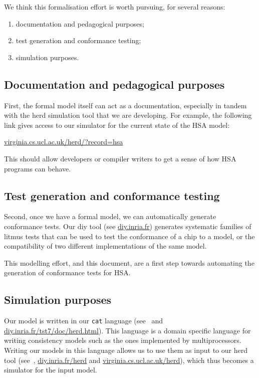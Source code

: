 We think this formalisation effort is worth pursuing, for several reasons:
\begin{enumerate}
\item documentation and pedagogical purposes;
\item test generation and conformance testing;
\item simulation purposes.
\end{enumerate}

\subsection*{Documentation and pedagogical purposes}

First, the formal model itself can act as a documentation, especially in tandem
with the {\sf herd} simulation tool that we are developing. For example, the
following link gives access to our simulator for the current state of the HSA
model:

\centerline{\url{virginia.cs.ucl.ac.uk/herd/?record=hsa}}

This should allow developers or compiler writers to get a sense of how HSA
programs can behave.

\subsection*{Test generation and conformance testing}

Second, once we have a formal model, we can automatically generate conformance
tests. Our {\sf diy} tool (see \url{diy.inria.fr}) generates systematic
families of litmus tests that can be used to test the conformance of a chip to
a model, or the compatibility of two different implementations of the same
model.

This modelling effort, and this document, are a first step towards automating
the generation of conformance tests for HSA.

\subsection*{Simulation purposes}
Our model is written in our {\tt cat} language (see~\cite{amt14} and
\url{diy.inria.fr/tst7/doc/herd.html}). This language is a domain specific
language for writing consistency models such as the ones implemented by
multiprocessors. Writing our models in this language allows us to use them as
input to our {\sf herd} tool (see~\cite{amt14}, \url{diy.inria.fr/herd} and
\url{virginia.cs.ucl.ac.uk/herd}), which thus becomes a simulator for the input
model.
